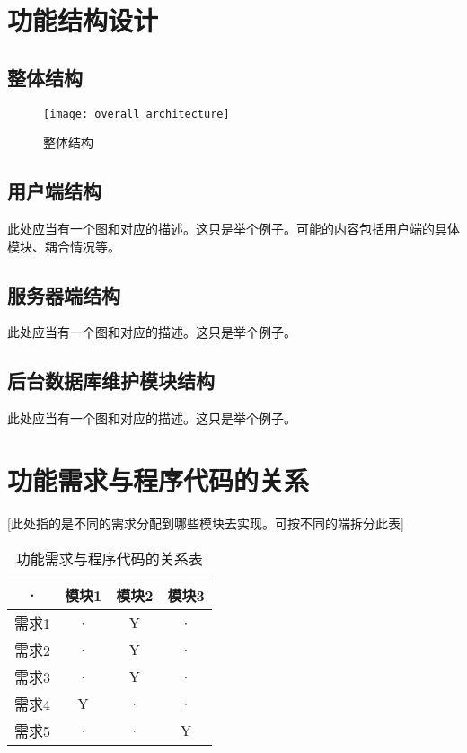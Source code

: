 \section{功能结构设计}
\subsection{整体结构}

\begin{figure}[h]
	\centering
	\texttt{[image: overall\_architecture]}
	\caption{整体结构} \label{fig:overall_architecture}
\end{figure}

\subsection{用户端结构}
此处应当有一个图和对应的描述。这只是举个例子。可能的内容包括用户端的具体模块、耦合情况等。

\subsection{服务器端结构}
此处应当有一个图和对应的描述。这只是举个例子。

\subsection{后台数据库维护模块结构}
此处应当有一个图和对应的描述。这只是举个例子。



\section{功能需求与程序代码的关系}
[此处指的是不同的需求分配到哪些模块去实现。可按不同的端拆分此表]
\begin{table}[htbp]
\centering
\caption{功能需求与程序代码的关系表} \label{tab:requirement-module}
\begin{tabular}{|c|c|c|c|}
    \hline
    · & 模块1 & 模块2 & 模块3 \\
    \hline
    需求1 & · & Y & · \\
    \hline
    需求2 & · & Y & · \\
    \hline
    需求3 & · & Y & · \\
    \hline
    需求4 & Y & · & · \\
    \hline
    需求5 & · & · & Y \\
    \hline
\end{tabular}
\end{table}